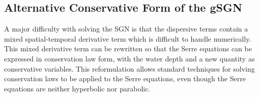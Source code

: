 \documentclass[10pt]{article}
\begin{document}
\subsection{Alternative Conservative Form of the gSGN}

A major difficulty with solving the SGN is that the dispersive terms contain a mixed spatial-temporal derivative term which is difficult to handle numerically. This mixed derivative term can be rewritten  so that the Serre equations can be expressed in conservation law form, with the water depth and a new quantity as conservative variables. This reformulation allows standard techniques for solving conservation laws to be applied to the Serre equations, even though the Serre equations are neither hyperbolic nor parabolic.
\end{document}
